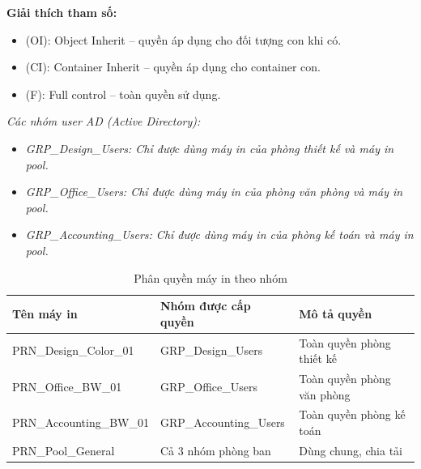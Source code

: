 \noindent\textbf{Giải thích tham số:}
\begin{itemize}[topsep=2pt,itemsep=1pt,parsep=0pt]
    \item (OI): Object Inherit – quyền áp dụng cho đối tượng con khi có.
    \item (CI): Container Inherit – quyền áp dụng cho container con.
    \item (F): Full control – toàn quyền sử dụng.
\end{itemize}

\noindent\textit{Các nhóm user AD (Active Directory):}
\begin{itemize}[topsep=2pt,itemsep=1pt,parsep=0pt]
    \item \textit{GRP\_Design\_Users: Chỉ được dùng máy in của phòng thiết kế và máy in pool.}
    \item \textit{GRP\_Office\_Users: Chỉ được dùng máy in của phòng văn phòng và máy in pool.}
    \item \textit{GRP\_Accounting\_Users: Chỉ được dùng máy in của phòng kế toán và máy in pool.}
\end{itemize}

\begin{table}[htbp]
    \centering
    \caption{Phân quyền máy in theo nhóm}
    \label{tab:printer_permissions}
    \begin{tabular}{|l|l|p{4.5cm}|}
        \hline
        \textbf{Tên máy in} & \textbf{Nhóm được cấp quyền} & \textbf{Mô tả quyền} \\ \hline
        PRN\_Design\_Color\_01 & GRP\_Design\_Users & Toàn quyền phòng thiết kế \\ \hline
        PRN\_Office\_BW\_01 & GRP\_Office\_Users & Toàn quyền phòng văn phòng \\ \hline
        PRN\_Accounting\_BW\_01 & GRP\_Accounting\_Users & Toàn quyền phòng kế toán \\ \hline
        PRN\_Pool\_General & Cả 3 nhóm phòng ban & Dùng chung, chia tải \\ \hline
    \end{tabular}
\end{table}

